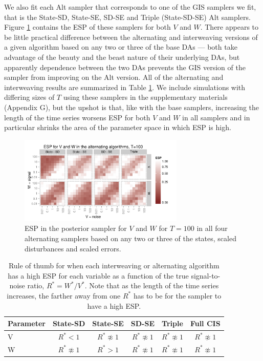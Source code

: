 \documentclass[12pt]{article}
\begin{document}
We also fit each Alt sampler that corresponds to one of the GIS samplers we fit, that is the State-SD, State-SE, SD-SE and Triple (State-SD-SE) Alt samplers. Figure \ref{altESplot} contains the ESP of these samplers for both $V$ and $W$. There appears to be little practical difference between the alternating and interweaving versions of a given algorithm based on any two or three of the base DAs --- both take advantage of the beauty and the beast nature of their underlying DAs, but apparently dependence between the two DAs prevents the GIS version of the sampler from improving on the Alt version. All of the alternating and interweaving results are summarized in Table \ref{tab:stnmix2}. We include simulations with differing sizes of $T$ using these samplers in the supplementary materials (Appendix G), but the upshot is that, like with the base samplers, increasing the length of the time series worsens ESP for both $V$ and $W$ in all samplers and in particular shrinks the area of the parameter space in which ESP is high.

\begin{figure}[!h]
\centering
\includegraphics[width=0.7\textwidth]{altESplot100}
\caption{ESP in the posterior sampler for $V$ and $W$ for $T=100$ in all four alternating samplers based on any two or three of the states, scaled disturbances and scaled errors.}
\label{altESplot}
\end{figure}

\begin{table}
  \centering
  \begin{tabular}{|l|ccccc|}\hline
    Parameter & State-SD        & State-SE       & SD-SE        & Triple            & Full CIS \\\hline
    V         & $R^* < 1$           & $R^* \not\approx 1$ & $R^* \not\approx 1$ & $R^* \not\approx 1$ & $R^* \not\approx 1$ \\
    W         & $R^* \not\approx 1$ & $R^* > 1$           & $R^* \not\approx 1$ & $R^* \not\approx 1$ & $R^* \not\approx 1$\\\hline
  \end{tabular}
  \caption{Rule of thumb for when each interweaving or alternating algorithm has a high ESP for each variable as a function of the true signal-to-noise ratio, $R^*=W^*/V^*$. Note that as the length of the time series increases, the farther away from one $R^*$ has to be for the sampler to have a high ESP.}
  \label{tab:stnmix2}
\end{table}
\end{document}

